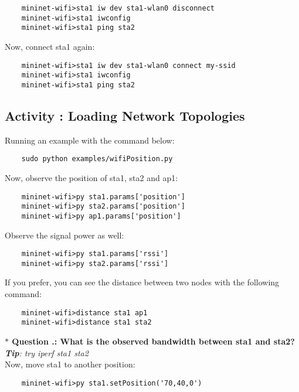 \begin{verbatim}
    mininet-wifi>sta1 iw dev sta1-wlan0 disconnect
    mininet-wifi>sta1 iwconfig
    mininet-wifi>sta1 ping sta2
\end{verbatim}


\noindent Now, connect sta1 again: 

\begin{verbatim}
    mininet-wifi>sta1 iw dev sta1-wlan0 connect my-ssid
    mininet-wifi>sta1 iwconfig
    mininet-wifi>sta1 ping sta2
\end{verbatim}


\subsection{Activity \themycounter{}: Loading Network Topologies}

\noindent Running an example with the command below:
\begin{verbatim}
    sudo python examples/wifiPosition.py
\end{verbatim}


\noindent Now, observe the position of sta1, sta2 and ap1:
\begin{verbatim}
    mininet-wifi>py sta1.params['position']
    mininet-wifi>py sta2.params['position']
    mininet-wifi>py ap1.params['position']
\end{verbatim}



\noindent Observe the signal power as well:
\begin{verbatim}
    mininet-wifi>py sta1.params['rssi']
    mininet-wifi>py sta2.params['rssi']
\end{verbatim}


\noindent If you prefer, you can see the distance between two nodes with the following command:

\begin{verbatim}
    mininet-wifi>distance sta1 ap1
    mininet-wifi>distance sta1 sta2   
\end{verbatim}


\noindent \textbf{$\ast$ Question \themycounter.\thequestion{}: What is the observed bandwidth between sta1 and sta2?}
\\\textit{\textbf{Tip}: try iperf sta1 sta2}
\\

\noindent Now, move sta1 to another position:
\begin{verbatim}
    mininet-wifi>py sta1.setPosition('70,40,0')
\end{verbatim}


